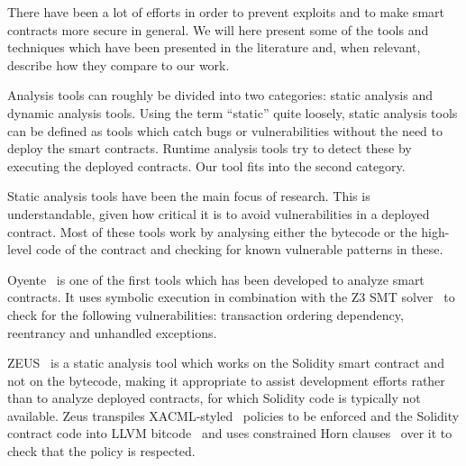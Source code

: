 

There have been a lot of efforts in order to prevent exploits and to make smart contracts more secure in general.
We will here present some of the tools and techniques which have been presented in the literature and, when relevant, describe how they compare to our work.

Analysis tools can roughly be divided into two categories: static analysis and dynamic analysis tools.
Using the term ``static'' quite loosely, static analysis tools can be defined as tools which catch bugs or vulnerabilities without the need to deploy the smart contracts.
Runtime analysis tools try to detect these by executing the deployed contracts.
Our tool fits into the second category.

 Static analysis tools have been the main focus of research.
This is understandable, given how critical it is to avoid vulnerabilities in a deployed contract.
Most of these tools work by analysing either the bytecode or the high-level code of the contract and checking for known vulnerable patterns in these.

Oyente~\cite{Luu2016a} is one of the first tools which has been developed to analyze smart contracts.
It uses symbolic execution in combination with the Z3 SMT solver~\cite{de2008z3} to check for the following vulnerabilities: transaction ordering dependency, reentrancy and unhandled exceptions.

ZEUS~\cite{DBLP:conf/ndss/KalraGDS18} is a static analysis tool which works on the Solidity smart contract and not on the bytecode, making it appropriate to assist development efforts rather than to analyze deployed contracts, for which Solidity code is typically not available.
Zeus transpiles XACML-styled~\cite{XACML} policies to be enforced and the Solidity contract code into LLVM bitcode~\cite{lattner2004llvm} and uses constrained Horn clauses~\cite{bjorner2012program,mcmillan2007interpolants} over it to check that the policy is respected.


